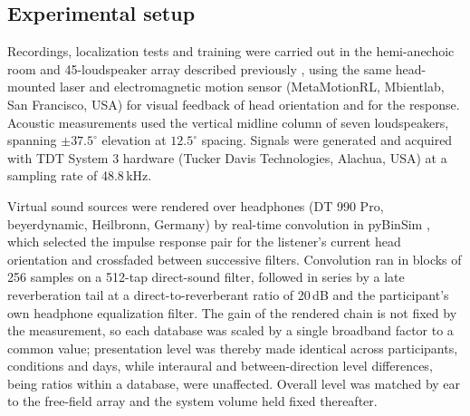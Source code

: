 
\subsection{Experimental setup}

Recordings, localization tests and training were carried out in the
hemi-anechoic room and 45-loudspeaker array described previously
, using the same head-mounted laser and electromagnetic motion sensor
(MetaMotionRL, Mbientlab, San Francisco, USA) for visual feedback of head
orientation and for the response. Acoustic measurements used the vertical
midline column of seven loudspeakers, spanning $\pm37.5^\circ$ elevation at
$12.5^\circ$ spacing. Signals were generated and acquired with TDT System 3
hardware (Tucker Davis Technologies, Alachua, USA) at a sampling rate of
48.8\,kHz.

Virtual sound sources were rendered over headphones (DT 990 Pro,
beyerdynamic, Heilbronn, Germany) by real-time convolution in pyBinSim
, which selected the impulse response pair for the listener's current head
orientation and crossfaded between successive filters. Convolution ran in
blocks of 256 samples on a 512-tap direct-sound filter, followed in series by a
late reverberation tail at a direct-to-reverberant ratio of 20\,dB and the
participant's own headphone equalization filter. The gain of the rendered chain is
not fixed by the measurement, so each database was scaled by a single
broadband factor to a common value; presentation
level was thereby made identical across participants, conditions and days,
while interaural and between-direction level differences, being ratios within
a database, were unaffected. Overall level was matched by ear to the
free-field array and the system volume held fixed thereafter.


